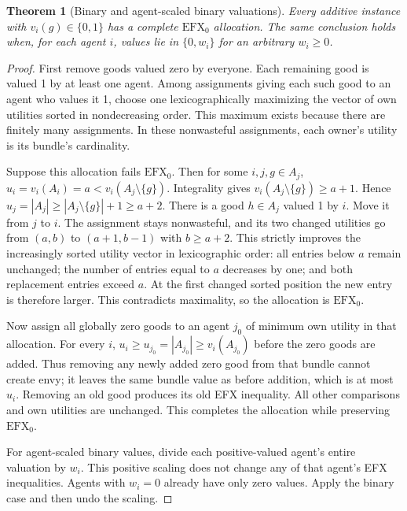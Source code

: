\documentclass[11pt,a4paper]{article}
\newtheorem{theorem}{Theorem}[section]
\theoremstyle{definition}
\theoremstyle{remark}
\begin{document}
\begin{theorem}[Binary and agent-scaled binary valuations]
Every additive instance with $v_i(g)\in\{0,1\}$ has a complete $\mathrm{EFX}_0$ allocation. The same conclusion holds when, for each agent $i$, values lie in $\{0,w_i\}$ for an arbitrary $w_i\geq0$.
\end{theorem}
\begin{proof}
First remove goods valued zero by everyone. Each remaining good is valued 1 by at least one agent. Among assignments giving each such good to an agent who values it 1, choose one lexicographically maximizing the vector of own utilities sorted in nondecreasing order. This maximum exists because there are finitely many assignments. In these nonwasteful assignments, each owner's utility is its bundle's cardinality.

Suppose this allocation fails $\mathrm{EFX}_0$. Then for some $i,j,g\in A_j$,
$u_i=v_i(A_i)=a<v_i(A_j\setminus\{g\})$.
Integrality gives $v_i(A_j\setminus\{g\})\geq a+1$. Hence
$u_j=|A_j|\geq |A_j\setminus\{g\}|+1\geq a+2$.
There is a good $h\in A_j$ valued 1 by $i$. Move it from $j$ to $i$. The assignment stays nonwasteful, and its two changed utilities go from $(a,b)$ to $(a+1,b-1)$ with $b\geq a+2$. This strictly improves the increasingly sorted utility vector in lexicographic order: all entries below $a$ remain unchanged; the number of entries equal to $a$ decreases by one; and both replacement entries exceed $a$. At the first changed sorted position the new entry is therefore larger. This contradicts maximality, so the allocation is $\mathrm{EFX}_0$.

Now assign all globally zero goods to an agent $j_0$ of minimum own utility in that allocation. For every $i$,
$u_i\geq u_{j_0}=|A_{j_0}|\geq v_i(A_{j_0})$
before the zero goods are added. Thus removing any newly added zero good from that bundle cannot create envy; it leaves the same bundle value as before addition, which is at most $u_i$. Removing an old good produces its old EFX inequality. All other comparisons and own utilities are unchanged. This completes the allocation while preserving $\mathrm{EFX}_0$.

For agent-scaled binary values, divide each positive-valued agent's entire valuation by $w_i$. This positive scaling does not change any of that agent's EFX inequalities. Agents with $w_i=0$ already have only zero values. Apply the binary case and then undo the scaling.
\end{proof}
\end{document}
